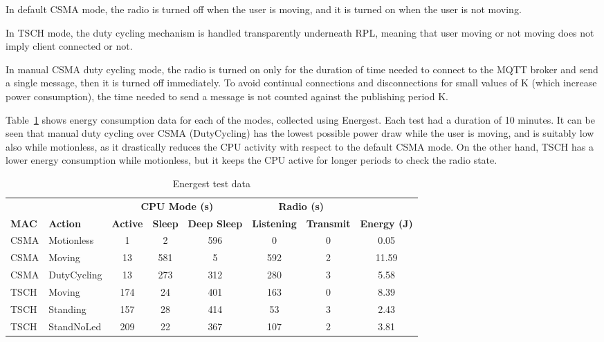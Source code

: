 \documentclass[a4paper, 10pt]{article}
\begin{document}
In default CSMA mode, the radio is turned off when the user is moving, and it is turned on when the user is not moving.

In TSCH mode, the duty cycling mechanism is handled transparently underneath RPL, meaning that user moving or not moving does not imply client connected or not.

In manual CSMA duty cycling mode, the radio is turned on only for the duration of time needed to connect to the MQTT broker and send a single message, then it is turned off immediately. To avoid continual connections and disconnections for small values of K (which increase power consumption), the time needed to send a message is not counted against the publishing period K.

Table~\ref{table:energest} shows energy consumption data for each of the modes, collected using Energest. Each test had a duration of 10 minutes.
It can be seen that manual duty cycling over CSMA (DutyCycling) has the lowest possible power draw while the user is moving, and is suitably low also while motionless, as it drastically reduces the CPU activity with respect to the default CSMA mode.
On the other hand, TSCH has a lower energy consumption while motionless, but it keeps the CPU active for longer periods to check the radio state.


\begin{table}[!htb]
\begin{tabular}{ll|ccc|cc|c}
& & \multicolumn{3}{c|}{ \textbf{CPU Mode (s)} } & \multicolumn{2}{c|}{ \textbf{Radio (s)} } & \\
\textbf{MAC} & \textbf{Action} & \textbf{Active} & \textbf{Sleep} & \textbf{Deep Sleep} & \textbf{Listening} & \textbf{Transmit} & \textbf{Energy (J)} \\
CSMA & Motionless & 1 & 2 & 596 & 0 & 0 & 0.05 \\
CSMA & Moving & 13 & 581 & 5 & 592 & 2 & 11.59 \\
CSMA & DutyCycling & 13 & 273 & 312 & 280 & 3 & 5.58 \\
TSCH & Moving & 174 & 24 & 401 & 163 & 0 & 8.39 \\
TSCH & Standing & 157 & 28 & 414 & 53 & 3 & 2.43 \\
TSCH & StandNoLed & 209 & 22 & 367 & 107 & 2 & 3.81 \\
\end{tabular}
\caption{Energest test data}
\label{table:energest}
\end{table}

\end{document}
